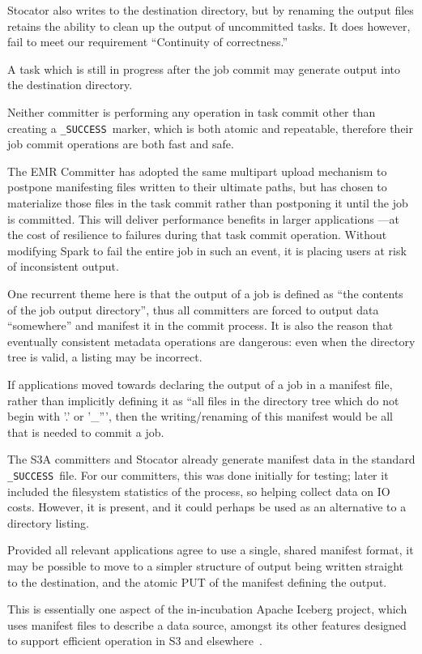 \documentclass[conference]{IEEEtran}
\newcommand{\SUCCESS}{\texttt{\_SUCCESS}\ }
\begin{document}
Stocator also writes to the destination directory, but by renaming the output
files retains the ability to clean up the output of uncommitted tasks.
It does however, fail to meet our requirement ``Continuity of correctness.''

A task which is still in progress after the job commit may generate output
into the destination directory.

Neither committer is performing any operation in task commit other than creating
a \SUCCESS marker, which is both atomic and repeatable, therefore their job commit
operations are both fast and safe.

The EMR Committer has adopted the same multipart upload mechanism to postpone
manifesting files written to their ultimate paths, but has chosen to materialize
those files in the task commit rather than postponing it until the job is committed.
This will deliver performance benefits in larger applications ---at the cost
of resilience to failures during that task commit operation.
Without modifying Spark to fail the entire job in such an event, it is placing
users at risk of inconsistent output.


One recurrent theme here is that the output of a job is defined as
``the contents of the job output directory'', thus all committers are
forced to output data ``somewhere'' and manifest it in the commit process.
It is also the reason that eventually consistent metadata operations are
dangerous: even when the directory tree is valid, a listing may be incorrect.

If applications moved towards declaring the output of a job in
a manifest file, rather than implicitly defining it as ``all files in the directory
tree which do not begin with '.' or '\_''', then the writing/renaming
of this manifest would be all that is needed to commit a job.

The S3A committers and Stocator already generate manifest data in the
standard \SUCCESS file.
For our committers, this was done initially for testing;
later it included the filesystem statistics of the process, so helping
collect data on IO costs.
However, it is present, and it could perhaps be used as an alternative to
a directory listing.

Provided all relevant applications agree to use a single, shared manifest
format, it may be possible to move to a simpler structure of
output being written straight to the destination, and the atomic PUT of the
manifest defining the output.

This is essentially one aspect of the in-incubation Apache Iceberg project,
which uses manifest files to describe a data source, amongst its other
features designed to support efficient operation in S3 and elsewhere\ \cite{iceberg, iceberg:slides}.
\end{document}
